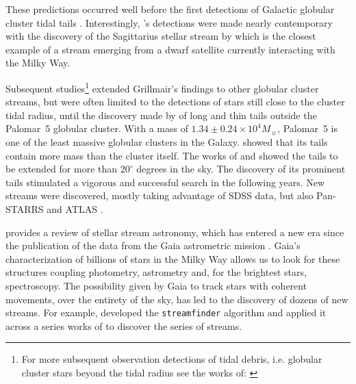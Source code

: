 \documentclass[draft]{aa}
\begin{document}
  These predictions occurred well before the first detections of Galactic globular cluster tidal tails \citep{1995AJ....109.2553G}. Interestingly, \citep{1995AJ....109.2553G}'s detections were made nearly contemporary  with the discovery of the Sagittarius stellar stream by \citet{1994Natur.370..194I} which is the closest example of a stream emerging from a dwarf satellite currently interacting with the Milky Way. 
  
  Subsequent studies\footnote{For more subsequent observation detections of tidal debris, i.e. globular cluster stars beyond the tidal radius see the works of: \citet{1997A&A...320..776L, 2000A&A...356..127T, 2000A&A...359..907L, 2001AAS...19910906S, 2003AJ....126..815L}} extended Grillmair's findings to other globular cluster streams, but were often limited to the detections of stars still close to the cluster tidal radius, until the discovery made by \citet{2001ApJ...548L.165O,2002AAS...200.1001O, 2003AJ....126.2385O} of long and thin tails outside the Palomar~5 globular cluster. With a mass of $1.34\pm 0.24 \times 10^4 M_{\sun}$, Palomar~5 is one of the least massive globular clusters in the Galaxy. \citet{2003AJ....126.2385O} showed that its tails contain more mass than the cluster itself. The works of \citet{2006ApJ...641L..37G} and \citet{2015MNRAS.446.3297K} showed the tails to be extended for more than $20^\circ$ degrees in the sky. The discovery of its prominent tails stimulated a vigorous and successful search in the following years. New streams were discovered, mostly taking advantage of SDSS data, but also Pan-STARRS and ATLAS  \citep{2006ApJ...643L..17G, 2006ApJ...637L..29B, 2009ApJ...693.1118G, 2012ApJ...760L...6B, 2013ApJ...769L..23G, 2014ApJ...790L..10G, 2015ApJ...812L..26G, 2014MNRAS.443L..84B, 2016MNRAS.463.1759B, 2017ApJ...847..119G, 2014MNRAS.442L..85K}. 
  
  
  \citet{2025NewAR.10001713B} provides a review of stellar stream astronomy, which has entered a new era since the publication of the data from the Gaia astrometric mission \citep{2016A&A...595A...1G}. Gaia's characterization of billions of stars in the Milky Way allows us to look for these structures coupling photometry, astrometry and, for the brightest stars, spectroscopy. The possibility given by Gaia to track stars with coherent movements, over the entirety of the sky, has led to the discovery of dozens of new streams. For example, \citet{2018MNRAS.477.4063M} developed the \texttt{streamfinder} algorithm and applied it across a series works of \citep{2018MNRAS.481.3442M,  2018ApJ...865...85I, 2019ApJ...872..152I} to discover the series of streams.%
  
\end{document}
